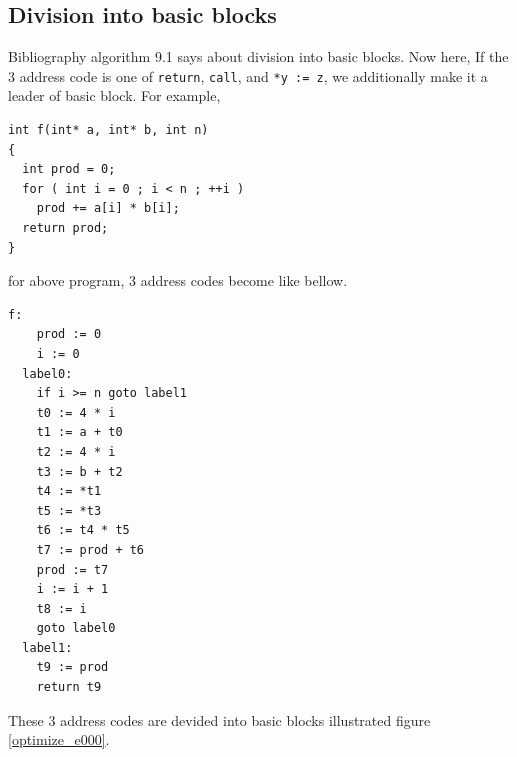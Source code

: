 \subsection{Division into basic blocks}

Bibliography \cite{doragon} algorithm 9.1 says about 
division into basic blocks. Now here, If the 3 address
code is one of {\tt{return}}, {\tt{call}},
and {\tt{*y := z}}, we additionally
make it  a leader of basic block.
For example,
\begin{verbatim}
int f(int* a, int* b, int n)
{
  int prod = 0;
  for ( int i = 0 ; i < n ; ++i )
    prod += a[i] * b[i];
  return prod;
}
\end{verbatim}
for above program, 3 address codes become like bellow.
\begin{verbatim}
f:
    prod := 0
    i := 0
  label0:
    if i >= n goto label1
    t0 := 4 * i
    t1 := a + t0
    t2 := 4 * i
    t3 := b + t2
    t4 := *t1
    t5 := *t3
    t6 := t4 * t5
    t7 := prod + t6
    prod := t7
    i := i + 1
    t8 := i
    goto label0
  label1:
    t9 := prod
    return t9
\end{verbatim}
These 3 address codes are devided into basic blocks illustrated
figure \ref{optimize_e000}.
